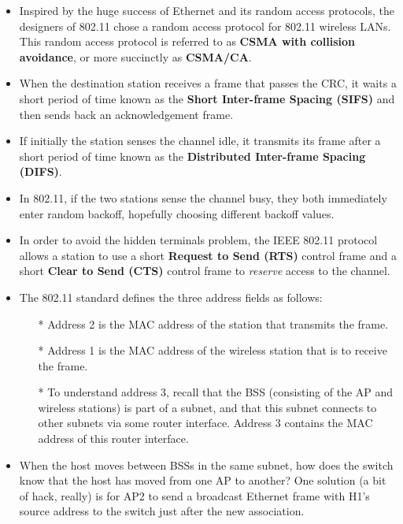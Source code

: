 \begin{itemize}
\item
Inspired by the huge success of Ethernet and its random access protocols, the designers of 802.11 chose a random access protocol for 802.11 wireless LANs. This random access protocol is referred to as \textbf{CSMA with collision avoidance}, or more succinctly as \textbf{CSMA/CA}.

\item
When the destination station receives a frame that passes the CRC, it waits a short period of time known as the \textbf{Short Inter-frame Spacing (SIFS)} and then sends back an acknowledgement frame.

\item
If initially the station senses the channel idle, it transmits its frame after a short period of time known as the \textbf{Distributed Inter-frame Spacing (DIFS)}.

\item
In 802.11, if the two stations sense the channel busy, they both immediately enter random backoff, hopefully choosing different backoff values.

\item
In order to avoid the hidden terminals problem, the IEEE 802.11 protocol allows a station to use a short \textbf{Request to Send (RTS)} control frame and a short \textbf{Clear to Send (CTS)} control frame to \textit{reserve} access to the channel.


\item
The 802.11 standard defines the three address fields as follows:
\begin{itemize}
\item[*]Address 2 is the MAC address of the station that transmits the frame.
\item[*]Address 1 is the MAC address of the wireless station that is to receive the frame.
\item[*]To understand address 3, recall that the BSS (consisting of the AP and wireless stations) is part of a subnet, and that this subnet connects to other subnets via some router interface. Address 3 contains the MAC address of this router interface.
\end{itemize}

\item
When the host moves between BSSs in the same subnet, how does the switch know that the host has moved from one AP to another? One solution (a bit of hack, really) is for AP2 to send a broadcast Ethernet frame with H1's source address to the switch just after the new association.


\end{itemize}
